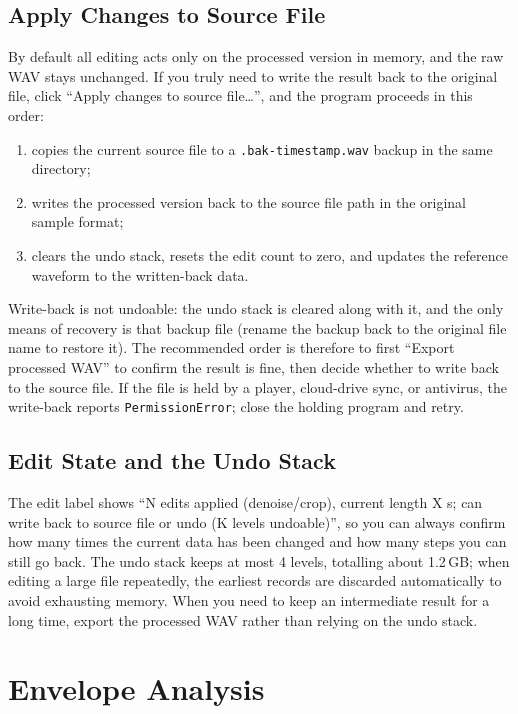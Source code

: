 \documentclass[UTF8,a4paper,12pt]{ctexart}
\begin{document}
\subsection{Apply Changes to Source File}

By default all editing acts only on the processed version in memory, and the raw WAV stays unchanged. If you truly need to write the result back to the original file, click ``Apply changes to source file\dots'', and the program proceeds in this order:

\begin{enumerate}
  \item copies the current source file to a \texttt{.bak-timestamp.wav} backup in the same directory;
  \item writes the processed version back to the source file path in the original sample format;
  \item clears the undo stack, resets the edit count to zero, and updates the reference waveform to the written-back data.
\end{enumerate}

Write-back is not undoable: the undo stack is cleared along with it, and the only means of recovery is that backup file (rename the backup back to the original file name to restore it). The recommended order is therefore to first ``Export processed WAV'' to confirm the result is fine, then decide whether to write back to the source file. If the file is held by a player, cloud-drive sync, or antivirus, the write-back reports \texttt{PermissionError}; close the holding program and retry.

\subsection{Edit State and the Undo Stack}

The edit label shows ``N edits applied (denoise/crop), current length X s; can write back to source file or undo (K levels undoable)'', so you can always confirm how many times the current data has been changed and how many steps you can still go back. The undo stack keeps at most 4 levels, totalling about 1.2\,GB; when editing a large file repeatedly, the earliest records are discarded automatically to avoid exhausting memory. When you need to keep an intermediate result for a long time, export the processed WAV rather than relying on the undo stack.

\section{Envelope Analysis}
\end{document}
